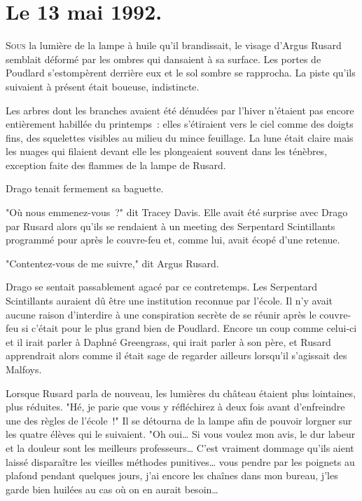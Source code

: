 
\section{Le 13 mai 1992.}

\lettrine{S}{ous} la lumière de la lampe à huile qu'il brandissait, le visage d'Argus Rusard semblait déformé par les ombres qui dansaient à sa surface. Les portes de Poudlard s'estompèrent derrière eux et le sol sombre se rapprocha. La piste qu'ils suivaient à présent était boueuse, indistincte.

Les arbres dont les branches avaient été dénudées par l'hiver n'étaient pas encore entièrement habillée du printemps~: elles s'étiraient vers le ciel comme des doigts fins, des squelettes visibles au milieu du mince feuillage. La lune était claire mais les nuages qui filaient devant elle les plongeaient souvent dans les ténèbres, exception faite des flammes de la lampe de Rusard.

Drago tenait fermement sa baguette.

"Où nous emmenez-vous~?" dit Tracey Davis. Elle avait été surprise avec Drago par Rusard alors qu'ils se rendaient à un meeting des Serpentard Scintillants programmé pour après le couvre-feu et, comme lui, avait écopé d'une retenue.

"Contentez-vous de me suivre," dit Argus Rusard.

Drago se sentait passablement agacé par ce contretemps. Les Serpentard Scintillants auraient dû être une institution reconnue par l'école. Il n'y avait aucune raison d'interdire à une conspiration secrète de se réunir après le couvre-feu si c'était pour le plus grand bien de Poudlard. Encore un coup comme celui-ci et il irait parler à Daphné Greengrass, qui irait parler à son père, et Rusard apprendrait alors comme il était sage de regarder ailleurs lorsqu'il s'agissait des Malfoys.

Lorsque Rusard parla de nouveau, les lumières du château étaient plus lointaines, plus réduites. "Hé, je parie que vous y réfléchirez à deux fois avant d'enfreindre une des règles de l'école~!" Il se détourna de la lampe afin de pouvoir lorgner sur les quatre élèves qui le suivaient. "Oh oui… Si vous voulez mon avis, le dur labeur et la douleur sont les meilleurs professeurs… C'est vraiment dommage qu'ils aient laissé disparaître les vieilles méthodes punitives… vous pendre par les poignets au plafond pendant quelques jours, j'ai encore les chaînes dans mon bureau, j'les garde bien huilées au cas où on en aurait besoin…

